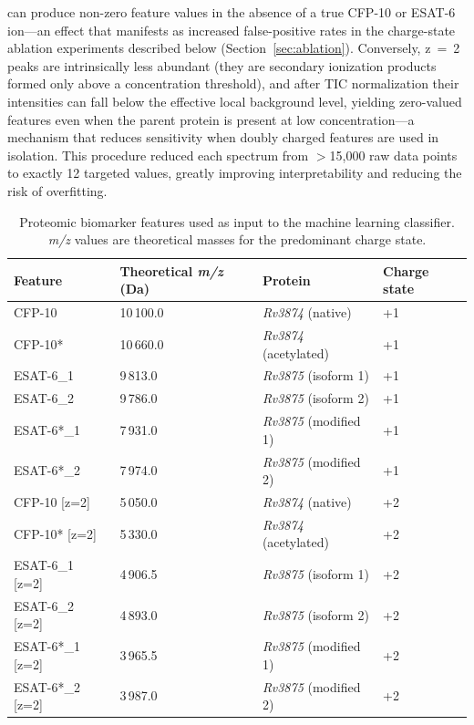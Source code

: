 \documentclass[journal=ancham, manuscript=article, layout=traditional]{achemso}
\begin{document}
can produce non-zero feature values in the absence of a true
CFP-10 or ESAT-6 ion---an effect that manifests as increased
false-positive rates in the charge-state ablation experiments
described below (Section~\ref{sec:ablation}).
Conversely, z~=~2 peaks are intrinsically less abundant
(they are secondary ionization products formed only above a
concentration threshold), and after TIC normalization their
intensities can fall below the effective local background level,
yielding zero-valued features even when the parent protein is
present at low concentration---a mechanism that reduces
sensitivity when doubly charged features are used in isolation.
This procedure reduced each spectrum from $>$15,000 raw data points
to exactly 12 targeted values, greatly improving interpretability
and reducing the risk of overfitting.\cite{Broadhurst2018}

\begin{table}
  \caption{Proteomic biomarker features used as input to the machine
  learning classifier. \textit{m/z} values are theoretical masses for
  the predominant charge state.}
  \label{tab:biomarkers}
  \small
  \begin{tabular}{llll}
    \toprule
    Feature & Theoretical \textit{m/z} (Da) & Protein & Charge state \\
    \midrule
    CFP-10       & 10\,100.0 & \textit{Rv3874} (native)     & +1 \\
    CFP-10*      & 10\,660.0 & \textit{Rv3874} (acetylated) & +1 \\
    ESAT-6\_1    &  9\,813.0 & \textit{Rv3875} (isoform 1)  & +1 \\
    ESAT-6\_2    &  9\,786.0 & \textit{Rv3875} (isoform 2)  & +1 \\
    ESAT-6*\_1   &  7\,931.0 & \textit{Rv3875} (modified 1) & +1 \\
    ESAT-6*\_2   &  7\,974.0 & \textit{Rv3875} (modified 2) & +1 \\
    CFP-10 [z=2]    & 5\,050.0 & \textit{Rv3874} (native)     & +2 \\
    CFP-10* [z=2]   & 5\,330.0 & \textit{Rv3874} (acetylated) & +2 \\
    ESAT-6\_1 [z=2] & 4\,906.5 & \textit{Rv3875} (isoform 1)  & +2 \\
    ESAT-6\_2 [z=2] & 4\,893.0 & \textit{Rv3875} (isoform 2)  & +2 \\
    ESAT-6*\_1 [z=2] & 3\,965.5 & \textit{Rv3875} (modified 1) & +2 \\
    ESAT-6*\_2 [z=2] & 3\,987.0 & \textit{Rv3875} (modified 2) & +2 \\
    \bottomrule
  \end{tabular}
\end{table}
\end{document}
